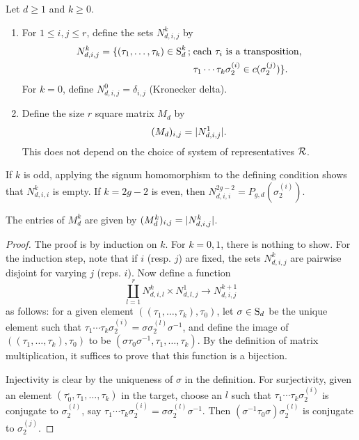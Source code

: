 \begin{defi}
 Let $d\geq 1$ and $k\geq 0$.
 \begin{enumerate}
  \item For $1\leq i,j\leq r$, define the sets $N_{d,i,j}^k$ by
  \begin{align*}
   N_{d,i,j}^k = \{(\tau_1,\dotsc,\tau_k)\in \operatorname{S}_d^{k} \,;\; &\text{each }\tau_i\text{ is a transposition,}\\ &\tau_1\dotsm\tau_k\sigma_2^{(i)}\in c(\sigma_2^{(j)})\}.
  \end{align*}
  For $k=0$, define $N_{d,i,j}^0=\delta_{i,j}$ (Kronecker delta).
  \item Define the size $r$ square matrix $M_d$ by
  \[
   (M_d)_{i,j}=|N_{d,i,j}^1|.
  \]
  This does not depend on the choice of system of representatives $\mathcal{R}$.
 \end{enumerate}
\end{defi}

\begin{rmk}
 If $k$ is odd, applying the signum homomorphism to the defining condition shows that $N_{d,i,i}^k$ is empty. If $k=2g-2$ is even, then $N_{d,i,i}^{2g-2}=P_{g,d}(\sigma_2^{(i)})$.
\end{rmk}

\begin{prop}
 The entries of $M_d^k$ are given by $(M_d^k)_{i,j}=|N_{d,i,j}^k|$.
\end{prop}
\begin{proof}
 The proof is by induction on $k$. For $k=0,1$, there is nothing to show. For the induction step, note that if $i$ (resp. $j$) are fixed, the sets $N_{d,i,j}^k$ are pairwise disjoint for varying $j$ (reps. $i$). Now define a function
 \[
  \coprod_{l=1}^r N_{d,i,l}^k \times N_{d,l,j}^1 \to N_{d,i,j}^{k+1}
 \]
 as follows: for a given element $((\tau_1,\dotsc,\tau_k),\tau_0)$, let $\sigma\in\operatorname{S}_d$ be the unique element such that $\tau_1\dotsm\tau_k\sigma_2^{(i)}=\sigma\sigma_2^{(l)}\sigma^{-1}$, and define the image of $((\tau_1,\dotsc,\tau_k),\tau_0)$ to be $(\sigma\tau_0\sigma^{-1},\tau_1,\dotsc,\tau_k)$. By the definition of matrix multiplication, it suffices to prove that this function is a bijection.
 
 Injectivity is clear by the uniqueness of $\sigma$ in the definition. For surjectivity, given an element $(\tau^{\textrm{,}}_0,\tau_1,\dotsc,\tau_k)$ in the target, choose an $l$ such that $\tau_1\dotsm\tau_k\sigma_2^{(i)}$ is conjugate to $\sigma_2^{(l)}$, say $\tau_1\dotsm\tau_k\sigma_2^{(i)}=\sigma\sigma_2^{(l)}\sigma^{-1}$. Then $(\sigma^{-1}\tau_0\sigma)\sigma_2^{(l)}$ is conjugate to $\sigma_2^{(j)}$.
\end{proof}

